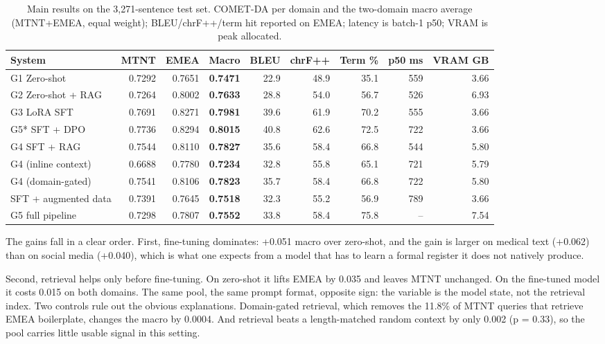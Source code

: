 \documentclass[a4paper,12pt,oneside]{article}
\begin{document}
\begin{table}[htbp]
\centering
\footnotesize
\setlength{\tabcolsep}{3.5pt}
\begin{tabular}{lrrrrrrrr}
\toprule
\textbf{System} & \textbf{MTNT} & \textbf{EMEA} & \textbf{Macro} & \textbf{BLEU} & \textbf{chrF++} & \textbf{Term \%} & \textbf{p50 ms} & \textbf{VRAM GB} \\
\midrule
G1 Zero-shot & 0.7292 & 0.7651 & \textbf{0.7471} & 22.9 & 48.9 & 35.1 & 559 & 3.66 \\
G2 Zero-shot + RAG & 0.7264 & 0.8002 & \textbf{0.7633} & 28.8 & 54.0 & 56.7 & 526 & 6.93 \\
G3 LoRA SFT & 0.7691 & 0.8271 & \textbf{0.7981} & 39.6 & 61.9 & 70.2 & 555 & 3.66 \\
G5* SFT + DPO & 0.7736 & 0.8294 & \textbf{0.8015} & 40.8 & 62.6 & 72.5 & 722 & 3.66 \\
G4 SFT + RAG & 0.7544 & 0.8110 & \textbf{0.7827} & 35.6 & 58.4 & 66.8 & 544 & 5.80 \\
G4 (inline context) & 0.6688 & 0.7780 & \textbf{0.7234} & 32.8 & 55.8 & 65.1 & 721 & 5.79 \\
G4 (domain-gated) & 0.7541 & 0.8106 & \textbf{0.7823} & 35.7 & 58.4 & 66.8 & 722 & 5.80 \\
SFT + augmented data & 0.7391 & 0.7645 & \textbf{0.7518} & 32.3 & 55.2 & 56.9 & 789 & 3.66 \\
G5 full pipeline & 0.7298 & 0.7807 & \textbf{0.7552} & 33.8 & 58.4 & 75.8 & -- & 7.54 \\
\bottomrule
\end{tabular}
\caption{Main results on the 3,271-sentence test set. COMET-DA per domain and the two-domain macro average (MTNT+EMEA, equal weight); BLEU/chrF++/term hit reported on EMEA; latency is batch-1 p50; VRAM is peak allocated.}
\end{table}

The gains fall in a clear order. First, fine-tuning dominates: +0.051 macro over zero-shot, and
the gain is larger on medical text (+0.062) than on social media (+0.040), which is what one
expects from a model that has to learn a formal register it does not natively produce.

Second, retrieval helps only before fine-tuning. On zero-shot it lifts EMEA by 0.035 and leaves
MTNT unchanged. On the fine-tuned model it costs 0.015 on both domains. The same pool, the same
prompt format, opposite sign: the variable is the model state, not the retrieval index. Two
controls rule out the obvious explanations. Domain-gated retrieval, which removes the 11.8\% of
MTNT queries that retrieve EMEA boilerplate, changes the macro by 0.0004. And retrieval beats a
length-matched random context by only 0.002 (p = 0.33), so the pool carries little usable signal
in this setting.
\end{document}
